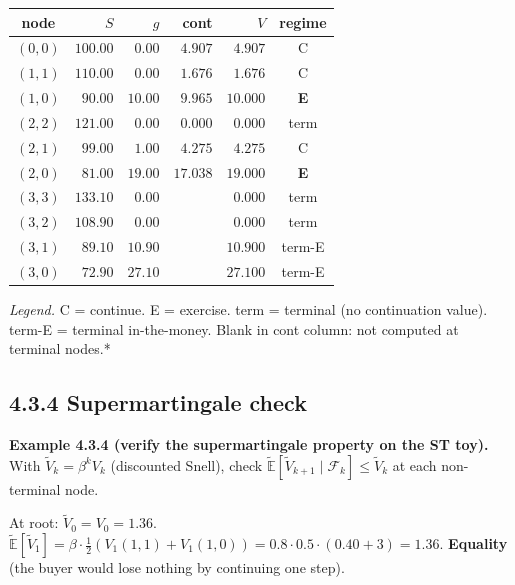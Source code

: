 \documentclass[
  10pt,
  twoside]{book}
\newcounter{none} %
\begin{document}
{\def\LTcaptype{none} %
\begin{table}[H]
\centering
\begin{tabular}{|c|r|r|r|r|c|}
\toprule
node & \(S\) & \(g\) & cont & \(V\) & regime \\
\midrule



\((0,0)\) & \(100.00\) & \(\phantom{0}0.00\) & \(\phantom{0}4.907\) &
\(\phantom{0}4.907\) & C \\
\((1,1)\) & \(110.00\) & \(\phantom{0}0.00\) & \(\phantom{0}1.676\) &
\(\phantom{0}1.676\) & C \\
\((1,0)\) & \(\phantom{0}90.00\) & \(10.00\) & \(\phantom{0}9.965\) &
\(10.000\) & \textbf{E} \\
\((2,2)\) & \(121.00\) & \(\phantom{0}0.00\) & \(\phantom{0}0.000\) &
\(\phantom{0}0.000\) & term \\
\((2,1)\) & \(\phantom{0}99.00\) & \(\phantom{0}1.00\) &
\(\phantom{0}4.275\) & \(\phantom{0}4.275\) & C \\
\((2,0)\) & \(\phantom{0}81.00\) & \(19.00\) & \(17.038\) & \(19.000\) &
\textbf{E} \\
\((3,3)\) & \(133.10\) & \(\phantom{0}0.00\) & & \(\phantom{0}0.000\) &
term \\
\((3,2)\) & \(108.90\) & \(\phantom{0}0.00\) & & \(\phantom{0}0.000\) &
term \\
\((3,1)\) & \(\phantom{0}89.10\) & \(10.90\) & & \(10.900\) & term-E \\
\((3,0)\) & \(\phantom{0}72.90\) & \(27.10\) & & \(27.100\) & term-E \\
\bottomrule
\end{tabular}
\end{table}
}

\emph{Legend.} C = continue. E = exercise. term = terminal (no
continuation value). term-E = terminal in-the-money. Blank in cont
column: not computed at terminal nodes.*

\subsection{4.3.4 Supermartingale check}\label{supermartingale-check}

\textbf{Example 4.3.4 (verify the supermartingale property on the ST
toy).} With \(\tilde V_k = \beta^k V_k\) (discounted Snell), check
\(\tilde{\mathbb{E}}[\tilde V_{k+1}\mid\mathcal F_k] \le \tilde V_k\) at
each non-terminal node.

At root: \(\tilde V_0 = V_0 = 1.36\).
\(\tilde{\mathbb{E}}[\tilde V_1] = \beta\cdot\tfrac{1}{2}(V_1(1,1) + V_1(1,0)) = 0.8\cdot 0.5\cdot(0.40 + 3) = 1.36\).
\textbf{Equality} (the buyer would lose nothing by continuing one step).
\end{document}

